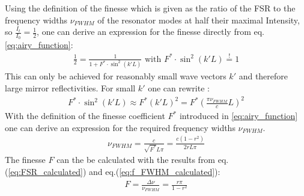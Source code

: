 Using the definition of the finesse which is given as the ratio of the FSR to the frequency widths $\nu_{\scriptscriptstyle FWHM}$ of the resonator  modes at half their maximal Intensity, so $\frac{I_t}{I_0}=\frac{1}{2}$, one can derive an expression for the finesse directly from eq. \ref{eq:airy_function}:
\begin{align}
	\frac{1}{2} = \frac{1}{1+F^*\cdot \sin^2(k'L)} \text{     with      } F^*\cdot \sin^2(k'L) \overset{!}{=} 1
\end{align}
This can only be achieved for reasonably small wave vectors $k'$ and therefore large mirror reflectivities. For small $k'$ one can rewrite \cite{Lauterborn2003}:
\begin{align*}
	F^*\cdot \sin^2(k'L) \approx  F^*(k'L)^2 = F^*\left(\frac{\pi \nu_{\scriptscriptstyle FWHM}}{c} L\right)^2
\end{align*}
With the definition of the finesse coefficient $F^*$ introduced in \ref{eq:airy_function} one can derive an expression for the required frequency widths $\nu_{\scriptscriptstyle FWHM}$.
\begin{align}
	\nu_{\scriptscriptstyle FWHM}= \frac{c}{\sqrt{F^*}L\pi} = \frac{c(1-r^2)}{2rL\pi}
	\label{eq:f_FWHM_calculated}
\end{align}
The finesse $F$ can the be calculated with the results from eq.(\ref{eq:FSR_calculated}) and eq.(\ref{eq:f_FWHM_calculated}):
\begin{align}
	F=\frac{\Delta\nu}{\nu_{\scriptscriptstyle FWHM}}=\frac{r\pi}{1-r^2}
\end{align}
